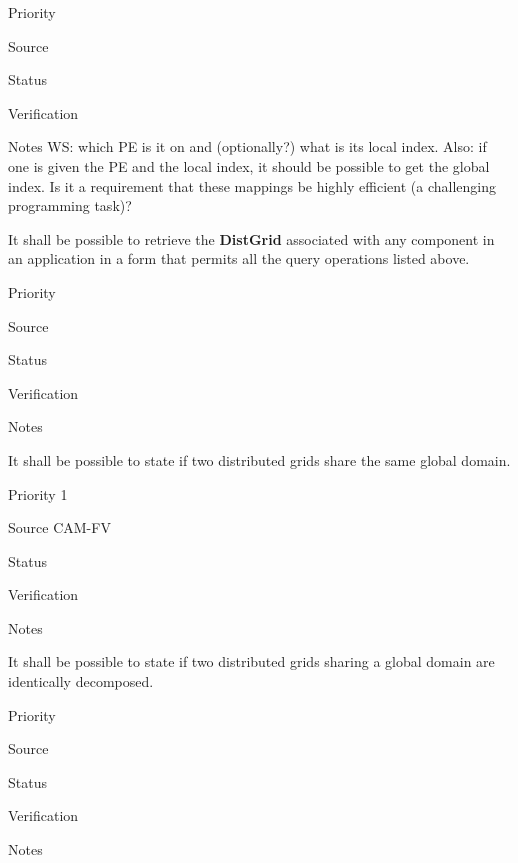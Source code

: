 \begin{reqlist}
\item[Priority] 
\item[Source]
\item[Status]
\item[Verification]
\item[Notes] WS: which PE is it on and (optionally?) what 
is its local index.  Also: if one is given the PE and the local index, 
it should be possible to get the global index.  Is it a requirement that
these mappings be highly efficient (a challenging programming task)?
\end{reqlist}


It shall be possible to retrieve the \textbf{DistGrid} associated with
any component in an application in a form that permits all the query
operations listed above.

\begin{reqlist}
\item[Priority]
\item[Source]
\item[Status]
\item[Verification]
\item[Notes]
\end{reqlist}



It shall be possible to state if two distributed grids share the same
global domain.

\begin{reqlist}
\item[Priority] 1
\item[Source] CAM-FV
\item[Status]
\item[Verification]
\item[Notes]
\end{reqlist}



It shall be possible to state if two distributed grids sharing a
global domain are identically decomposed.

\begin{reqlist}
\item[Priority]
\item[Source]
\item[Status]
\item[Verification]
\item[Notes]
\end{reqlist}


